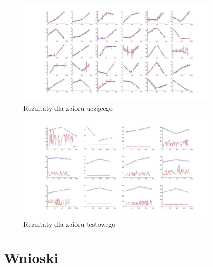 \documentclass[12pt]{article}
\begin{document}
\begin{figure}
\centering
	\includegraphics[width=0.90\textwidth]{fig1.jpg}\par\vspace{1cm}
\caption{Rezultaty dla zbioru uczącego}
	\label{fig:features}
\end{figure}

\begin{figure}
\centering
	\includegraphics[width=0.90\textwidth]{fig2.jpg}\par\vspace{1cm}
\caption{Rezultaty dla zbioru testowego}
	\label{fig:features}
\end{figure}

\section{Wnioski}
\end{document}
